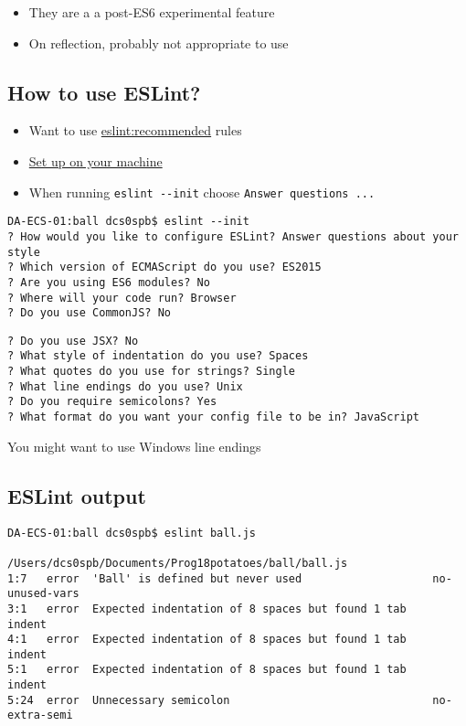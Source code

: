 \documentclass{article}[18pt]
\providecommand{\tightlist}{%
	\setlength{\itemsep}{0pt}\setlength{\parskip}{0pt}}
\begin{document}
\begin{itemize}
	\tightlist
	\item
	They are a a post-ES6 experimental feature
	\item
	On reflection, probably not appropriate to use
\end{itemize}

\hypertarget{how-to-use-eslint}{%
	\subsection{How to use ESLint?}\label{how-to-use-eslint}}

\begin{itemize}
	\tightlist
	\item
	Want to use \href{https://eslint.org/docs/rules/}{eslint:recommended}
	rules
	\item
	\href{https://eslint.org/docs/user-guide/getting-started}{Set up on
		your machine}
	\item
	When running \texttt{eslint\ -\/-init} choose
	\texttt{Answer\ questions\ ...}
\end{itemize}

\begin{verbatim}
DA-ECS-01:ball dcs0spb$ eslint --init
? How would you like to configure ESLint? Answer questions about your style
? Which version of ECMAScript do you use? ES2015
? Are you using ES6 modules? No
? Where will your code run? Browser
? Do you use CommonJS? No
\end{verbatim}

\begin{verbatim}
? Do you use JSX? No
? What style of indentation do you use? Spaces
? What quotes do you use for strings? Single
? What line endings do you use? Unix
? Do you require semicolons? Yes
? What format do you want your config file to be in? JavaScript
\end{verbatim}

You might want to use Windows line endings

\hypertarget{eslint-output}{%
	\subsection{ESLint output}\label{eslint-output}}

\begin{verbatim}
DA-ECS-01:ball dcs0spb$ eslint ball.js

/Users/dcs0spb/Documents/Prog18potatoes/ball/ball.js
1:7   error  'Ball' is defined but never used                    no-unused-vars
3:1   error  Expected indentation of 8 spaces but found 1 tab    indent
4:1   error  Expected indentation of 8 spaces but found 1 tab    indent
5:1   error  Expected indentation of 8 spaces but found 1 tab    indent
5:24  error  Unnecessary semicolon                               no-extra-semi
\end{verbatim}
\end{document}
